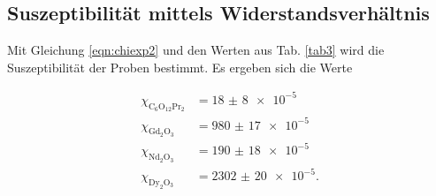 \subsection{Suszeptibilität mittels Widerstandsverhältnis}
Mit Gleichung \eqref{eqn:chiexp2} und den Werten aus Tab. \ref{tab3}
wird die Suszeptibilität der Proben bestimmt.
Es ergeben sich die Werte

\begin{align*} 
   \chi_{\text{C}_6 \text{O}_{12} \text{Pr}_2} &= \num{18(8)e-5}\\
   \chi_{\text{Gd}_2 \text{O}_3} &= \num{980(17)e-5}\\
   \chi_{\text{Nd}_2 \text{O}_3} &= \num{190(18)e-5}\\
   \chi_{\text{Dy}_2 \text{O}_3} &= \num{2302(20)e-5}.
\end{align*}
